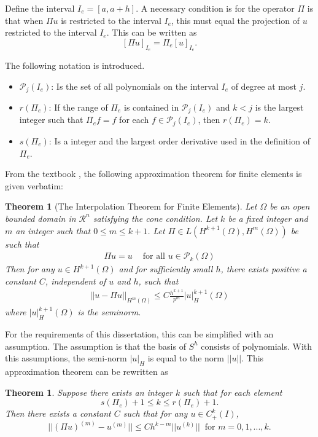 \documentclass[../../main.tex]{subfiles}
\begin{document}
Define the interval $I_e = [a, a+h]$. A necessary condition is for the operator $\Pi$ is that when $\Pi u$ is restricted to the interval $I_e$, this must equal the projection of $u$ restricted to the interval $I_e$. This can be written as
\begin{equation*}
	\left[ \Pi u \right]_{I_{e}} = \Pi_e [u]_{I_{e}}.
\end{equation*}

The following notation is introduced.
\begin{itemize}
	\item[] $\mathcal{P}_j(I_e)$: Is the set of all polynomials on the interval $I_e$ of degree at most $j$. \label{sym:poly}
	\item[] $r(\Pi_e)$: If the range of $\Pi_e$ is contained in $\mathcal{P}_j(I_e)$ and $k<j$ is the largest integer such that $\Pi_e f = f$ for each $f \in \mathcal{P}_j(I_e)$, then $r(\Pi_e) = k$.
	\item[] $s(\Pi_e)$: Is a integer and the largest order derivative used in the definition of $\Pi_e$.
\end{itemize}

From the textbook \cite{OR76}, the following approximation theorem for finite elements is given verbatim:
\newtheorem*{Interpolation}{Theorem}
\begin{Interpolation}[The Interpolation Theorem for Finite Elements] 
	Let $\Omega$ be an open bounded domain in $\mathcal{R}^n$ satisfying the cone condition. Let $k$ be a fixed integer and $m$ an integer such that $0\leq m \leq k+1$. Let $\Pi \in L(H^{k+1}(\Omega), H^{m}(\Omega))$ be such that
	\begin{eqnarray}
	    \Pi u = u \ \ \ \ \textrm{ for all } u \in \mathcal{P}_k(\Omega)
	\end{eqnarray}
	Then for any $u \in H^{k+1}(\Omega)$ and for sufficiently small $h$, there exists positive a constant $C$, independent of $u$ and $h$, such that
	\begin{eqnarray}
	    ||u - \Pi u||_{H^m(\Omega)} \leq C \frac{h^{k+1}}{p^m} |u|_H^{k+1}(\Omega)
	\end{eqnarray}
	where $|u|_H^{k+1}(\Omega)$ is the seminorm.
\end{Interpolation}

For the requirements of this dissertation, this can be simplified with an assumption. The assumption is that the basis of $S^h$ consists of polynomials. With this assumptions, the semi-norm $|u|_H$ is equal to the norm $||u||$. This approximation theorem can be rewritten as
\newtheorem{Interpolation_2}{Theorem}
\begin{Interpolation_2}
	Suppose there exists an integer $k$ such that for each element
	\begin{equation*}
		s(\Pi_e) + 1 \leq k \leq r(\Pi_e) +1.
	\end{equation*}
	Then there exists a constant $C$ such that for any $u \in C^k_+(I)$,
	\begin{equation*}
		||(\Pi u)^{(m)} - u^{(m)}|| \leq C h^{k-m} || u^{(k)}|| \ \text{ for } m = 0,1,...,k.
	\end{equation*}
\end{Interpolation_2}
\end{document}
